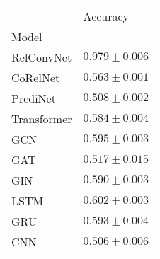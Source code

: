 \begin{tabular}{ll}
\toprule
{} &           Accuracy \\
Model       &                    \\
\midrule
RelConvNet  &  $0.979 \pm 0.006$ \\
CoRelNet    &  $0.563 \pm 0.001$ \\
PrediNet    &  $0.508 \pm 0.002$ \\
Transformer &  $0.584 \pm 0.004$ \\
GCN         &  $0.595 \pm 0.003$ \\
GAT         &  $0.517 \pm 0.015$ \\
GIN         &  $0.590 \pm 0.003$ \\
LSTM        &  $0.602 \pm 0.003$ \\
GRU         &  $0.593 \pm 0.004$ \\
CNN         &  $0.506 \pm 0.006$ \\
\bottomrule
\end{tabular}
